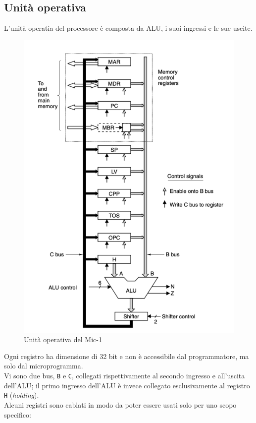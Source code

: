 \subsection{Unità operativa}
L'unità operatia del processore è composta da ALU, i suoi ingressi e le sue uscite.
\begin{figure}[H]
	\centering
	\includegraphics[width=1\textwidth]{img/Esercizio_9/uo_mic-1}
	\caption{Unità operativa del Mic-1}
	\label{uo_mic-1} 
\end{figure}
\noindent Ogni registro ha dimensione di 32 bit e non è accessibile dal programmatore, ma solo dal microprogramma.\\
Vi sono due bus, \texttt{B} e \texttt{C}, collegati rispettivamente al secondo ingresso e all'uscita dell'ALU; il primo ingresso dell'ALU è invece collegato esclusivamente al registro \texttt{H} (\textit{holding}).\\
Alcuni registri sono cablati in modo da poter essere usati solo per uno scopo specifico:
